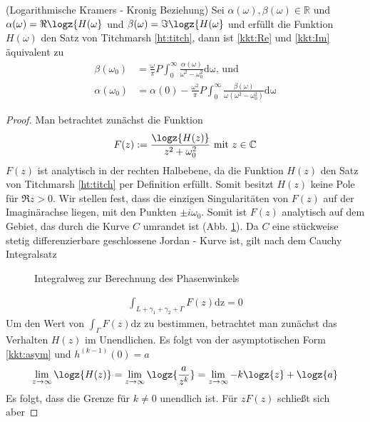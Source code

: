 \begin{satz}\label{lkk}(Logarithmische Kramers - Kronig Beziehung) Sei $\alpha(\omega), \beta(\omega) \in \mathbb{R}$ und $\alpha(\omega) = \Re{\logz{H(\omega}}$ und $\beta(\omega) = \Im{\logz{H(\omega}}$ und erfüllt die Funktion $H(\omega)$ den Satz von Titchmarsh \ref{ht:titch}, dann ist \ref{kkt:Re} und \ref{kkt:Im} äquivalent zu 
\begin{align}
	\beta(\omega_0) &= \frac{ \omega}{\pi} P \int_0^{\infty} \frac{\alpha(\omega)}{\omega^2 - \omega_0^2} \mathrm{d\omega} \text{, und}\label{lkk:gl:beta}\\
	\alpha(\omega_0) &= \alpha(0) - \frac{\omega^2}{\pi} P \int_0^{\infty} \frac{\beta(\omega)}{\omega(\omega^2 - \omega_0^2)} \mathrm{d\omega}\label{lkk:gl:alpha}
\end{align}
\begin{proof}
Man betrachtet zunächst die Funktion 
\begin{align}
	F(z) := \frac{\logz{H(z)}}{z^2 + \omega_0^2} \text{ mit } z \in \mathbb{C}
\end{align}
$F(z)$ ist analytisch in der rechten Halbebene, da die Funktion $H(z)$ den Satz von Titchmarsh \ref{ht:titch} per Definition erfüllt. Somit besitzt $H(z)$ keine Pole für $\Re{z} > 0$. Wir stellen fest, dass die einzigen Singularitäten von $F(z)$ auf der Imaginärachse liegen, mit den Punkten $\pm i \omega_0$. Somit ist $F(z)$ analytisch auf dem Gebiet, das durch die Kurve $C$ umrandet ist (Abb. \ref{fig:integralweg1}).
Da $C$ eine stückweise stetig differenzierbare geschlossene Jordan - Kurve ist, gilt nach dem Cauchy Integralsatz 
\begin{figure}[ht]
	\centering
	\def\svgwidth{0.5\columnwidth}
	
	\caption{Integralweg zur Berechnung des Phasenwinkels}
	\label{fig:integralweg1}
\end{figure}
\begin{align}
\int_{L + \gamma_1 + \gamma_2 + \Gamma} F(z) \mathrm{dz} = 0 \label{lkk:int} 
\end{align}
Um den Wert von $\int_{\Gamma} F(z) \mathrm{dz} $ zu bestimmen, betrachtet man zunächst das Verhalten $H(z)$ im Unendlichen. Es folgt von der asymptotischen Form \ref{kkt:asym} und $h^{(k-1)}(0) = a$
\begin{align}
\lim_{z \rightarrow \infty} \logz{H(z)} = \lim_{z \rightarrow \infty} \logz{\frac{a}{z^{k}}} =  \lim_{z \rightarrow \infty} -k \logz{z} + \logz{a}
\end{align}
Es folgt, dass die Grenze für $k \neq 0$ unendlich ist. Für $z F(z)$ schließt sich aber

\end{proof}
\end{satz}
